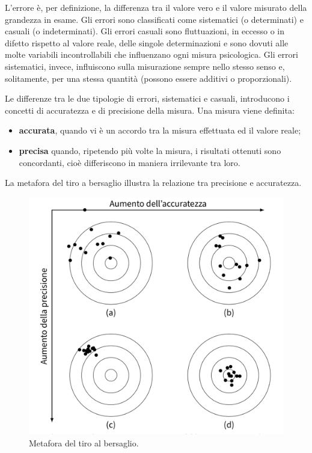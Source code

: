 \documentclass[
]{memoir}
\providecommand{\tightlist}{%
  \setlength{\itemsep}{0pt}\setlength{\parskip}{0pt}}
\theoremstyle{definition}
\theoremstyle{definition}
\theoremstyle{definition}
\theoremstyle{definition}
\theoremstyle{remark}
\begin{document}
L'errore è, per definizione, la differenza tra il valore vero e il
valore misurato della grandezza in esame. Gli errori sono classificati
come sistematici (o determinati) e casuali (o indeterminati). Gli errori
casuali sono fluttuazioni, in eccesso o in difetto rispetto al valore
reale, delle singole determinazioni e sono dovuti alle molte variabili
incontrollabili che influenzano ogni misura psicologica. Gli errori
sistematici, invece, influiscono sulla misurazione sempre nello stesso
senso e, solitamente, per una stessa quantità (possono essere additivi o
proporzionali).

Le differenze tra le due tipologie di errori, sistematici e casuali,
introducono i concetti di accuratezza e di precisione della misura. Una
misura viene definita:

\begin{itemize}
\tightlist
\item
  \textbf{accurata}, quando vi è un accordo tra la misura effettuata ed il
  valore reale;
\item
  \textbf{precisa} quando, ripetendo più volte la misura, i risultati
  ottenuti sono concordanti, cioè differiscono in maniera irrilevante
  tra loro.
\end{itemize}

La metafora del tiro a bersaglio illustra la relazione tra precisione e accuratezza.

\begin{figure}

{\centering \includegraphics[width=32.81in]{images/misurazione_4} 

}

\caption{Metafora del tiro al bersaglio.}\label{fig:fig-tiro-bersaglio}
\end{figure}
\end{document}
